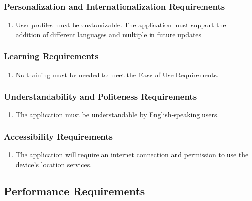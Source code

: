 \documentclass[]{article}
\begin{document}
\cbstart
\subsubsection{Personalization and Internationalization Requirements}
\label{ssub:personalization_and_internationalization_requirements}
\begin{enumerate}[{UH}2. ]
	\item User profiles must be customizable. The application must support the addition of different languages and multiple in future updates.
\end{enumerate}
\cbend

\subsubsection{Learning Requirements}
\label{ssub:learning_requirements}
\begin{enumerate}[{UH}3. ]
	\item No training must be needed to meet the Ease of Use Requirements.
\end{enumerate}

\cbstart
\subsubsection{Understandability and Politeness Requirements}
\label{ssub:understandability_and_politeness_requirements}
\begin{enumerate}[{UH}4. ]
	\item The application must be understandable by English-speaking users.
\end{enumerate}
\cbend

\subsubsection{Accessibility Requirements}
\label{ssub:accessibility_requirements}
\begin{enumerate}[{UH}5. ]
	\item The application will require an internet connection and permission to use the device's location services.
\end{enumerate}


\subsection{Performance Requirements}
\label{sub:performance_requirements}
\end{document}
